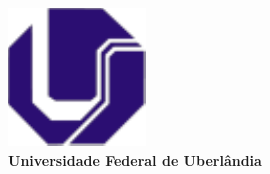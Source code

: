 \documentclass[12pt,fleqn,a4paper]{report}
\begin{document}
	\baselineskip 25pt
	\thispagestyle{empty}
	
	\begin{singlespace}
	
		\begin{figure}[htb]
			\begin{center}
				\includegraphics[scale=0.7]{layout_document/ufu.pdf}\\
				{\bf Universidade Federal de Uberl\^andia}
			\end{center}
		\end{figure}
		

\end{singlespace}
\end{document}

